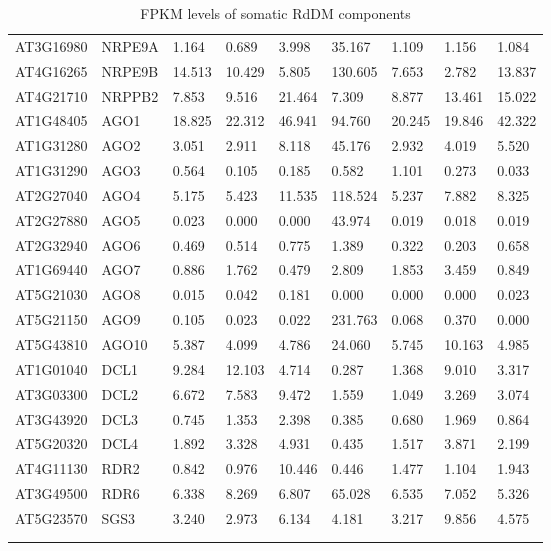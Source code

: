 \begin{landscape}
\begin{longtable}{l|l|llll|lll}
AT3G16980 & NRPE9A   & 1.164  & 0.689  & 3.998  & 35.167  & 1.109  & 1.156  & 1.084  \\
AT4G16265 & NRPE9B   & 14.513 & 10.429 & 5.805  & 130.605 & 7.653  & 2.782  & 13.837 \\
AT4G21710 & NRPPB2   & 7.853  & 9.516  & 21.464 & 7.309   & 8.877  & 13.461 & 15.022 \\ \hline
AT1G48405 & AGO1     & 18.825 & 22.312 & 46.941 & 94.760  & 20.245 & 19.846 & 42.322 \\
AT1G31280 & AGO2     & 3.051  & 2.911  & 8.118  & 45.176  & 2.932  & 4.019  & 5.520  \\
AT1G31290 & AGO3     & 0.564  & 0.105  & 0.185  & 0.582   & 1.101  & 0.273  & 0.033  \\
AT2G27040 & AGO4     & 5.175  & 5.423  & 11.535 & 118.524 & 5.237  & 7.882  & 8.325  \\
AT2G27880 & AGO5     & 0.023  & 0.000  & 0.000  & 43.974  & 0.019  & 0.018  & 0.019  \\
AT2G32940 & AGO6     & 0.469  & 0.514  & 0.775  & 1.389   & 0.322  & 0.203  & 0.658  \\
AT1G69440 & AGO7     & 0.886  & 1.762  & 0.479  & 2.809   & 1.853  & 3.459  & 0.849  \\
AT5G21030 & AGO8     & 0.015  & 0.042  & 0.181  & 0.000   & 0.000  & 0.000  & 0.023  \\
AT5G21150 & AGO9     & 0.105  & 0.023  & 0.022  & 231.763 & 0.068  & 0.370  & 0.000  \\
AT5G43810 & AGO10    & 5.387  & 4.099  & 4.786  & 24.060  & 5.745  & 10.163 & 4.985  \\ \hline
AT1G01040 & DCL1     & 9.284  & 12.103 & 4.714  & 0.287   & 1.368  & 9.010  & 3.317  \\
AT3G03300 & DCL2     & 6.672  & 7.583  & 9.472  & 1.559   & 1.049  & 3.269  & 3.074  \\
AT3G43920 & DCL3     & 0.745  & 1.353  & 2.398  & 0.385   & 0.680  & 1.969  & 0.864  \\
AT5G20320 & DCL4     & 1.892  & 3.328  & 4.931  & 0.435   & 1.517  & 3.871  & 2.199  \\ \hline
AT4G11130 & RDR2     & 0.842  & 0.976  & 10.446 & 0.446   & 1.477  & 1.104  & 1.943  \\
AT3G49500 & RDR6     & 6.338  & 8.269  & 6.807  & 65.028  & 6.535  & 7.052  & 5.326  \\ \hline
AT5G23570 & SGS3     & 3.240  & 2.973  & 6.134  & 4.181   & 3.217  & 9.856  & 4.575 \\ 
\caption{FPKM levels of somatic RdDM components} \\
\label{tab:FPKM_soma}\\
\end{longtable}
\end{landscape}